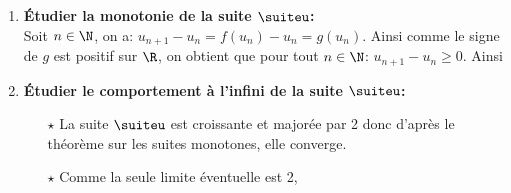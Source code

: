\begin{correction}
\begin{enumerate}
\begin{enumerate}
On montre par r\'ecurrence sur $n\in\N$ la propri\'et\'e $\mathcal{P}(n):\ u_n\ \hbox{existe et}\ u_n\in\left\rbrack \ddp\frac{2}{3},2\right\lbrack.$
\begin{itemize}
\item[$\star$] Initialisation: pour $n=0$: par d\'efinition de la suite, $u_0$ existe et $u_0\in\left\rbrack \ddp\frac{2}{3},2\right\lbrack$. Donc $\mathcal{P}(0)$ est vraie.
\item[$\star$] H\'er\'edit\'e: soit $n\in\N$ fix\'e, on suppose que la propri\'et\'e vraie \`{a} l'ordre $n$, montrons que $\mathcal{P}(n+1)$ est vraie.
Par hypoth\`{e}se de r\'ecurrence, on sait que $u_n$ existe et que $u_n\in\left\rbrack \ddp\frac{2}{3},2\right\lbrack$. Donc $f(u_n)$ existe c'est-\`{a}-dire $u_{n+1}$ existe.\\
De plus, $u_n\in\left\rbrack \ddp\frac{2}{3},2\right\lbrack$. Or l'intervalle $\left\rbrack \ddp\frac{2}{3},2\right\lbrack$ est stable par $f$. Donc $f(u_n)\in\left\rbrack \ddp\frac{2}{3},2\right\lbrack$ c'est-\`{a}-dire $u_{n+1}\in\left\rbrack \ddp\frac{2}{3},2\right\lbrack$. Donc $\mathcal{P}(n+1)$ est vraie.
\item[$\star$] Conclusion: il r\'esulte du principe de r\'ecurrence que

\end{itemize}
\item \textbf{\'Etudier la monotonie de la suite $\suiteu$:}\\
\noindent Soit $n\in\N$, on a: $u_{n+1}-u_n=f(u_n)-u_n=g(u_n)$. Ainsi comme le signe de $g$ est positif sur $\R$, on obtient que pour tout $n\in\N$: $u_{n+1}-u_n\geq 0$. Ainsi 
\item \textbf{\'Etudier le comportement \`{a} l'infini de la suite $\suiteu$:}
\begin{itemize}
\item[$\star$] La suite $\suiteu$ est croissante et major\'ee par 2 donc d'apr\`{e}s le th\'eor\`{e}me sur les suites monotones, elle converge.
\item[$\star$] Comme la seule limite \'eventuelle est 2, 
\end{itemize}
\end{enumerate} 
\end{enumerate}
\end{correction}